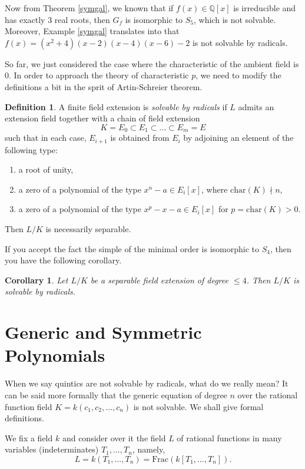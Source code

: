 \documentclass[12pt]{report}
\newtheorem{corollary}[theorem]{Corollary}
\theoremstyle{definition}
\newtheorem{definition}[theorem]{Definition}
\newcommand{\qq}{\mathbb{Q}}
\newcommand{\charr}{\text{char}}
\begin{document}
Now from Theorem \ref{symgal}, we known that if $f(x)\in \qq[x]$ is irreducible and has exactly 3 real roots, then $G_f$ is isomorphic to $S_5$, which is not solvable. Moreover, Example \ref{symgal} translates into that $f(x)=(x^2+4)(x-2)(x-4)(x-6)-2$ is not solvable by radicals.

So far, we just considered the case where the characteristic of the ambient field is 0. In order to approach the theory of characteristic $p$, we need to modify the definitions a bit in the sprit of Artin-Schreier theorem.

\begin{definition}
	A finite field extension is \emph{solvable by radicals} if $L$ admits an extension field together with a chain of field extension
	\[K=E_0\subset E_1\subset \dots\subset E_m=E\]
	such that in each case, $E_{i+1}$ is obtained from $E_i$ by adjoining an element of the following type:
	\begin{enumerate}
		\item a root of unity,
		\item a zero of a polynomial of the type $x^n-a\in E_i[x]$, where $\charr(K)\nmid n$,
		\item a zero of a polynomial of the type $x^p-x-a\in E_i[x]$ for $p=\charr(K)>0$.
	\end{enumerate}
	Then $L/K$ is necessarily separable.
\end{definition}

If you accept the fact the simple of the minimal order is isomorphic to $S_4$, then you have the following corollary.

\begin{corollary}
	Let $L/K$ be a separable field extension of degree $\leq 4$. Then $L/K$ is solvable by radicals.
\end{corollary}

\section{Generic and Symmetric Polynomials}
When we say quintics are not solvable by radicals, what do we really mean? It can be said more formally that the generic equation of degree $n$ over the rational function field $K=k(c_1,c_2,\dots,c_n)$ is not solvable. We shall give formal definitions.

We fix a field $k$ and consider over it the field $L$ of rational functions in many variables (indeterminates) $T_1,\dots,T_n$, namely, 
\[L=k(T_1,\dots,T_n)=\mbox{Frac}(k[T_1,\dots,T_n]).\]
\end{document}
